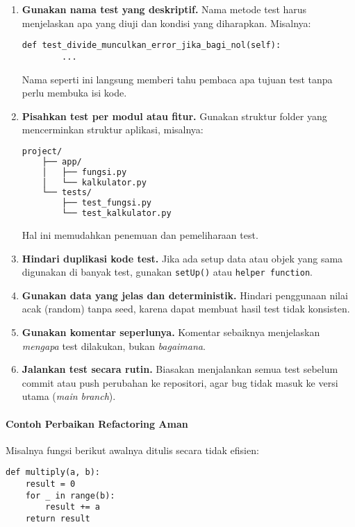 \begin{enumerate}
    \item \textbf{Gunakan nama test yang deskriptif.}  
    Nama metode test harus menjelaskan apa yang diuji dan kondisi yang diharapkan.  
    Misalnya:
    \begin{lstlisting}[style=PythonStyle]
    def test_divide_munculkan_error_jika_bagi_nol(self):
        ...
    \end{lstlisting}
    Nama seperti ini langsung memberi tahu pembaca apa tujuan test tanpa perlu membuka isi kode.

    \item \textbf{Pisahkan test per modul atau fitur.}  
    Gunakan struktur folder yang mencerminkan struktur aplikasi, misalnya:
    \begin{lstlisting}[language=bash]
    project/
    ├── app/
    │   ├── fungsi.py
    │   └── kalkulator.py
    └── tests/
        ├── test_fungsi.py
        └── test_kalkulator.py
    \end{lstlisting}
    Hal ini memudahkan penemuan dan pemeliharaan test.

    \item \textbf{Hindari duplikasi kode test.}  
    Jika ada setup data atau objek yang sama digunakan di banyak test, gunakan \texttt{setUp()} atau \texttt{helper function}.

    \item \textbf{Gunakan data yang jelas dan deterministik.}  
    Hindari penggunaan nilai acak (random) tanpa seed, karena dapat membuat hasil test tidak konsisten.

    \item \textbf{Gunakan komentar seperlunya.}  
    Komentar sebaiknya menjelaskan \textit{mengapa} test dilakukan, bukan \textit{bagaimana}.

    \item \textbf{Jalankan test secara rutin.}  
    Biasakan menjalankan semua test sebelum commit atau push perubahan ke repositori, agar bug tidak masuk ke versi utama (\textit{main branch}).
\end{enumerate}

\paragraph{Contoh Perbaikan Refactoring Aman}

Misalnya fungsi berikut awalnya ditulis secara tidak efisien:

\begin{lstlisting}[style=PythonStyle]
def multiply(a, b):
    result = 0
    for _ in range(b):
        result += a
    return result
\end{lstlisting}

